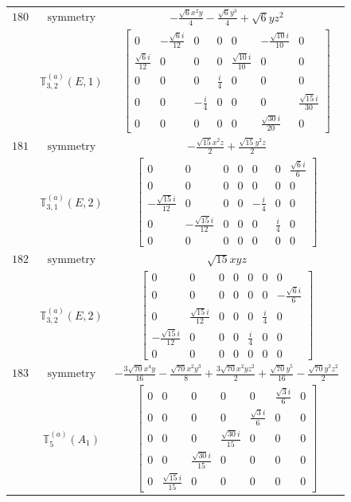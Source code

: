 \documentclass[fleqn,8pt,landscape]{jsarticle}
\begin{document}
\begin{longtable}{ccc}
$ 180 $ & $ \text{symmetry} $ & $ - \frac{\sqrt{6} x^{2} y}{4} - \frac{\sqrt{6} y^{3}}{4} + \sqrt{6} y z^{2} $ \\
$  $ & $ \mathbb{T}_{3,2}^{(a)}(E,1) $ & $ \begin{bmatrix} 0 & - \frac{\sqrt{6} i}{12} & 0 & 0 & 0 & - \frac{\sqrt{10} i}{10} & 0 \\ \frac{\sqrt{6} i}{12} & 0 & 0 & 0 & \frac{\sqrt{10} i}{10} & 0 & 0 \\ 0 & 0 & 0 & \frac{i}{4} & 0 & 0 & 0 \\ 0 & 0 & - \frac{i}{4} & 0 & 0 & 0 & \frac{\sqrt{15} i}{30} \\ 0 & 0 & 0 & 0 & 0 & \frac{\sqrt{30} i}{20} & 0 \end{bmatrix} $ \\ \hline
$ 181 $ & $ \text{symmetry} $ & $ - \frac{\sqrt{15} x^{2} z}{2} + \frac{\sqrt{15} y^{2} z}{2} $ \\
$  $ & $ \mathbb{T}_{3,1}^{(a)}(E,2) $ & $ \begin{bmatrix} 0 & 0 & 0 & 0 & 0 & 0 & \frac{\sqrt{6} i}{6} \\ 0 & 0 & 0 & 0 & 0 & 0 & 0 \\ - \frac{\sqrt{15} i}{12} & 0 & 0 & 0 & - \frac{i}{4} & 0 & 0 \\ 0 & - \frac{\sqrt{15} i}{12} & 0 & 0 & 0 & \frac{i}{4} & 0 \\ 0 & 0 & 0 & 0 & 0 & 0 & 0 \end{bmatrix} $ \\ \hline
$ 182 $ & $ \text{symmetry} $ & $ \sqrt{15} x y z $ \\
$  $ & $ \mathbb{T}_{3,2}^{(a)}(E,2) $ & $ \begin{bmatrix} 0 & 0 & 0 & 0 & 0 & 0 & 0 \\ 0 & 0 & 0 & 0 & 0 & 0 & - \frac{\sqrt{6} i}{6} \\ 0 & \frac{\sqrt{15} i}{12} & 0 & 0 & 0 & \frac{i}{4} & 0 \\ - \frac{\sqrt{15} i}{12} & 0 & 0 & 0 & \frac{i}{4} & 0 & 0 \\ 0 & 0 & 0 & 0 & 0 & 0 & 0 \end{bmatrix} $ \\ \hline
$ 183 $ & $ \text{symmetry} $ & $ - \frac{3 \sqrt{70} x^{4} y}{16} - \frac{\sqrt{70} x^{2} y^{3}}{8} + \frac{3 \sqrt{70} x^{2} y z^{2}}{2} + \frac{\sqrt{70} y^{5}}{16} - \frac{\sqrt{70} y^{3} z^{2}}{2} $ \\
$  $ & $ \mathbb{T}_{5}^{(a)}(A_{1}) $ & $ \begin{bmatrix} 0 & 0 & 0 & 0 & 0 & \frac{\sqrt{3} i}{6} & 0 \\ 0 & 0 & 0 & 0 & \frac{\sqrt{3} i}{6} & 0 & 0 \\ 0 & 0 & 0 & \frac{\sqrt{30} i}{15} & 0 & 0 & 0 \\ 0 & 0 & \frac{\sqrt{30} i}{15} & 0 & 0 & 0 & 0 \\ 0 & \frac{\sqrt{15} i}{15} & 0 & 0 & 0 & 0 & 0 \end{bmatrix} $ \\ \hline

\end{longtable}
\end{document}
